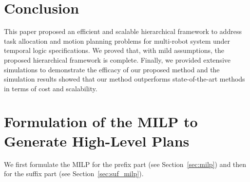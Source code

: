 \documentclass[Afour,sageh,times]{sagej}
\newcommand{\auto}[1]{\ccalA_{\textup{#1}}}
\newcommand{\aap}[4]{\mathcal{\pi}_{{#1},{#2}}^{#3,#4}}
\begin{document}
{{%
\section{Conclusion}\label{sec:conclusion}
This paper  proposed an efficient and scalable hierarchical framework to address task allocation and motion planning problems for multi-robot system under  temporal logic specifications. We proved that, with mild assumptions, the proposed hierarchical framework is complete. Finally, we provided extensive simulations to demonstrate the efficacy of our proposed method and the simulation results showed that our method outperforms state-of-the-art  methods in terms of cost and scalability.




\appendix
\section{Formulation of the MILP to Generate High-Level Plans}
We first formulate the MILP for the prefix part (see Section~\ref{sec:milp}) and then for the suffix part (see Section~\ref{sec:suf_milp}).
}}
\end{document}
